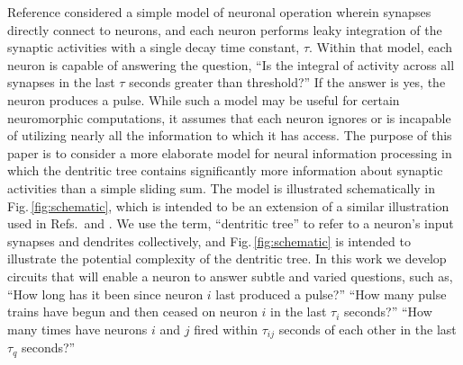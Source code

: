 \documentclass[twocolumn]{article}
\begin{document}
\begin{figure} 
\end{figure}
Reference \cite{sh2018} considered a simple model of neuronal operation wherein synapses directly connect to neurons, and each neuron performs leaky integration of the synaptic activities with a single decay time constant, $\tau$. Within that model, each neuron is capable of answering the question, ``Is the integral of activity across all synapses in the last $\tau$ seconds greater than threshold?'' If the answer is yes, the neuron produces a pulse. While such a model may be useful for certain neuromorphic computations, it assumes that each neuron ignores or is incapable of utilizing nearly all the information to which it has access. The purpose of this paper is to consider a more elaborate model for neural information processing in which the dentritic tree contains significantly more information about synaptic activities than a simple sliding sum. The model is illustrated schematically in Fig.\,\ref{fig:schematic}, which is intended to be an extension of a similar illustration used in Refs.\,\cite{sh2018} and \cite{sh2018_full}. We use the term, ``dentritic tree'' to refer to a neuron's input synapses and dendrites collectively, and Fig.\,\ref{fig:schematic} is intended to illustrate the potential complexity of the dentritic tree. In this work we develop circuits that will enable a neuron to answer subtle and varied questions, such as, ``How long has it been since neuron $i$ last produced a pulse?'' ``How many pulse trains have begun and then ceased on neuron $i$ in the last $\tau_i$ seconds?'' ``How many times have neurons $i$ and $j$ fired within $\tau_{ij}$ seconds of each other in the last $\tau_q$ seconds?''
\end{document}
